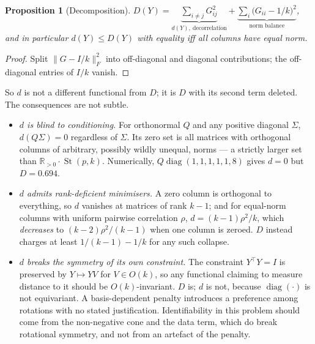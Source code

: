 \documentclass[11pt]{article}
\newtheorem{proposition}{Proposition}
\theoremstyle{definition}
\DeclareMathOperator{\st}{St}
\newcommand{\R}{\mathbb{R}}
\newcommand{\Rpos}{\R_{>0}}
\newcommand{\Fnorm}[1]{\lVert #1 \rVert_F}
\begin{document}
\begin{proposition}[Decomposition]\label{prop:decomp}
$D(Y) = \underbrace{\sum_{i\ne j}G_{ij}^2}_{d(Y),\ \text{decorrelation}}
      + \underbrace{\sum_i \big(G_{ii} - 1/k\big)^2}_{\text{norm balance}}$,
and in particular $d(Y) \le D(Y)$ with equality iff all columns have equal norm.
\end{proposition}
\begin{proof}
Split $\Fnorm{G - I/k}^2$ into off-diagonal and diagonal contributions; the
off-diagonal entries of $I/k$ vanish.
\end{proof}

So $d$ is not a different functional from $D$; it is $D$ with its second term
deleted. The consequences are not subtle.

\begin{itemize}\itemsep2pt
\item \emph{$d$ is blind to conditioning.} For orthonormal $Q$ and any positive
  diagonal $\Sigma$, $d(Q\Sigma) = 0$ regardless of $\Sigma$. Its zero set is
  all matrices with orthogonal columns of arbitrary, possibly wildly unequal,
  norms --- a strictly larger set than $\Rpos\cdot\st(p,k)$. Numerically,
  $Q\operatorname{diag}(1,1,1,1,1,8)$ gives $d = 0$ but $D = 0.694$.
\item \emph{$d$ admits rank-deficient minimisers.} A zero column is orthogonal to
  everything, so $d$ vanishes at matrices of rank $k-1$; and for equal-norm
  columns with uniform pairwise correlation $\rho$, $d = (k-1)\rho^2/k$, which
  \emph{decreases} to $(k-2)\rho^2/(k-1)$ when one column is zeroed. $D$ instead
  charges at least $1/(k-1) - 1/k$ for any such collapse.
\item \emph{$d$ breaks the symmetry of its own constraint.} The constraint
  $Y^\top Y = I$ is preserved by $Y \mapsto YV$ for $V \in O(k)$, so any
  functional claiming to measure distance to it should be $O(k)$-invariant. $D$
  is; $d$ is not, because $\operatorname{diag}(\cdot)$ is not equivariant. A
  basis-dependent penalty introduces a preference among rotations with no stated
  justification. Identifiability in this problem should come from the
  non-negative cone and the data term, which do break rotational symmetry, and
  not from an artefact of the penalty.
\end{itemize}
\end{document}
